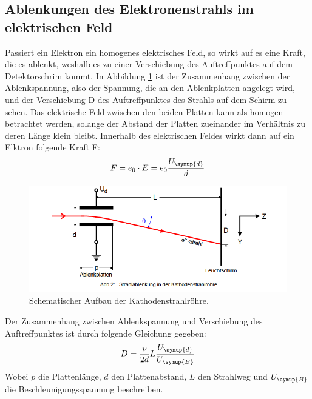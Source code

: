 \subsection{Ablenkungen des Elektronenstrahls im elektrischen Feld}
Passiert ein Elektron ein homogenes elektrisches Feld, so wirkt auf es eine Kraft, die es ablenkt,
weshalb es zu einer Verschiebung des Auftreffpunktes auf dem Detektorschrim kommt.
In Abbildung \ref{abb2} ist der Zusammenhang zwischen der Ablenkspannung, also der Spannung,
die an den Ablenkplatten angelegt wird, und der Verschiebung D des Auftreffpunktes des
Strahls auf dem Schirm zu sehen.
Das elektrische Feld zwischen den beiden Platten kann als homogen betrachtet werden, solange
der Abstand der Platten zueinander im Verhältnis zu deren Länge klein bleibt.
Innerhalb des elektrischen Feldes wirkt dann auf ein Elktron folgende Kraft F:
\begin{align*}\label{eq1}
  F = e_0 \cdot E = e_0 \frac{U_\symup{d}}{d}
\end{align*}
\FloatBarrier
\begin{figure}
  \centering
  \includegraphics[scale=0.5]{abl.PNG}
  \caption{Schematischer Aufbau der Kathodenstrahlröhre. \cite{Q1}}
  \label{abb2}
\end{figure}
Der Zusammenhang zwischen Ablenkspannung und Verschiebung des Auftreffpunktes ist durch
folgende Gleichung gegeben:
\begin{align*}
  D = \frac{p}{2d} L \frac{U_\symup{d}}{U_\symup{B}}
\end{align*}
Wobei $p$ die Plattenlänge, $d$ den Plattenabstand, $L$ den Strahlweg und $U_\symup{B}$ die Beschleunigungsspannung
beschreiben.
